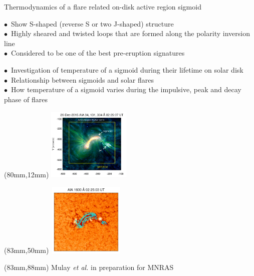\documentclass{beamer}
\begin{document}
\begin{frame}{\normalsize Thermodynamics of a flare related
on-disk active region sigmoid}

\vspace{-10mm}

 \begin{tcolorbox}[title=Sigmoids, width=72mm, left=1mm, beforeafter skip=5mm, beforeafter = 10mm, right = 1mm]
\scriptsize  $\bullet$~Show S-shaped (reverse S or two J-shaped) structure \\
             $\bullet$~Highly sheared and twisted loops that are formed along
the polarity inversion line \\
             $\bullet$~Considered to be one of the best pre-eruption signatures
\end{tcolorbox}

\begin{tcolorbox}[title=Research objective, width=72mm, left=1mm, beforeafter skip=1mm, beforeafter = 10mm, right = 1mm]
\scriptsize  $\bullet$~Investigation of temperature of a sigmoid during their
lifetime on solar disk \\
             $\bullet$~Relationship between sigmoids and solar flares \\
             $\bullet$~How temperature of a sigmoid varies during the
impulsive, peak and decay phase of flares
\end{tcolorbox}

\begin{textblock*}{30mm}(80mm,12mm)
\includegraphics[height = 35mm, width=40mm]{figs/sigmoid_img}
\end{textblock*}
\begin{textblock*}{30mm}(83mm,50mm)
\includegraphics[height = 35mm, width=37mm]{figs/aia1600}
\end{textblock*}


\begin{textblock*}{40mm}(83mm,88mm)
\tiny Mulay \textit{et al.} in preparation for MNRAS
 \end{textblock*}

\end{frame}
\end{document}
